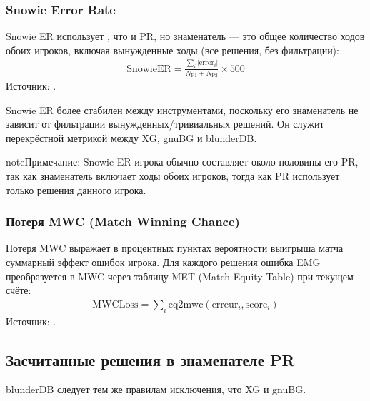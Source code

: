 \documentclass[letterpaper,10pt,russian]{sphinxmanual}
\begin{document}
\subsubsection{Snowie Error Rate}
\label{\detokenize{stats_parity:snowie-error-rate}}
\sphinxAtStartPar
Snowie ER использует , что и PR, но знаменатель — это общее количество ходов обоих игроков, включая вынужденные ходы (все решения, без фильтрации):
\begin{equation*}
\begin{split}\mathrm{SnowieER} = \frac{\sum_i |\mathrm{error}_i|}{N_\text{P1} + N_\text{P2}} \times 500\end{split}
\end{equation*}
\sphinxAtStartPar
Источник: .

\sphinxAtStartPar
Snowie ER более стабилен между инструментами, поскольку его знаменатель не зависит от фильтрации вынужденных/тривиальных решений. Он служит перекрёстной метрикой между XG, gnuBG и blunderDB.

\begin{sphinxadmonition}{note}{Примечание:}
\sphinxAtStartPar
Snowie ER игрока обычно составляет около половины его PR, так как знаменатель включает ходы обоих игроков, тогда как PR использует только решения данного игрока.
\end{sphinxadmonition}


\subsubsection{Потеря MWC (Match Winning Chance)}
\label{\detokenize{stats_parity:perte-mwc-match-winning-chance}}
\sphinxAtStartPar
Потеря MWC выражает в процентных пунктах вероятности выигрыша матча суммарный эффект ошибок игрока. Для каждого решения ошибка EMG преобразуется в MWC через таблицу MET (Match Equity Table) при текущем счёте:
\begin{equation*}
\begin{split}\mathrm{MWCLoss} = \sum_i \mathrm{eq2mwc}(\mathrm{erreur}_i, \mathrm{score}_i)\end{split}
\end{equation*}
\sphinxAtStartPar
Источник: .


\subsection{Засчитанные решения в знаменателе PR}
\label{\detokenize{stats_parity:decisions-comptees-au-denominateur-du-pr}}
\sphinxAtStartPar
blunderDB следует тем же правилам исключения, что XG и gnuBG.
\end{document}
